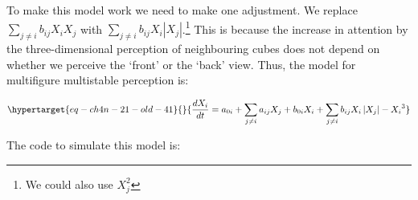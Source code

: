 \documentclass[
  a4paper,
  DIV=11,
  numbers=noendperiod]{scrreprt}
\begin{document}
To make this model work we need to make one adjustment. We replace
\(\sum_{j \neq i}^{}{b_{ij}X_{i}X_{j}}\) with
\(\sum_{j \neq i}^{}{b_{ij}X_{i}|X_{j}|}\).\footnote{We could also use
  \(X_j^2\)} This is because the increase in attention by the
three-dimensional perception of neighbouring cubes does not depend on
whether we perceive the `front' or the `back' view. Thus, the model for
multifigure multistable perception is:

\begin{equation}\protect\hypertarget{eq-ch4n-21-old-41}{}{
\frac{dX_{i}}{dt} = a_{0i} + \sum_{j \neq i}^{}{a_{ij}X_{j}} + b_{0i}X_{i} + \sum_{j \neq i}^{}{b_{ij}X_{i}\left| X_{j} \right|} - {X_{i}}^{3}
}\label{eq-ch4n-21-old-41}\end{equation}

The code to simulate this model is:
\end{document}
